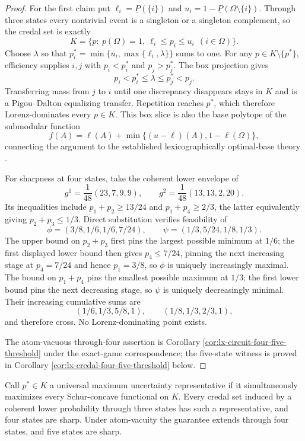 \begin{proof}
For the first claim put
$\ell_i=\underline P(\{i\})$ and
$u_i=1-\underline P(\Omega\setminus\{i\})$.  Through three states every
nontrivial event is a singleton or a singleton complement, so the credal set
is exactly
\[
 K=\{p:\ p(\Omega)=1,\ \ell_i\leq p_i\leq u_i\ \ (i\in\Omega)\}.
 \tag{BS}\label{eq:lx-credal-box-slice}
\]
Choose $\lambda$ so that
$p_i^*=\min\{u_i,\max\{\ell_i,\lambda\}\}$ sums to one.  For any
$p\in K\setminus\{p^*\}$, efficiency supplies $i,j$ with
$p_i<p_i^*$ and $p_j>p_j^*$.  The box projection gives
\[
 p_i<p_i^*\leq\lambda\leq p_j^*<p_j.
\]
Transferring mass from $j$ to $i$ until one discrepancy disappears stays in
$K$ and is a Pigou--Dalton equalizing transfer.  Repetition reaches $p^*$,
which therefore Lorenz-dominates every $p\in K$.  This box slice is also the
base polytope of the submodular function
\[
 f(A)=\ell(A)+\min\{(u-\ell)(A),1-\ell(\Omega)\},
\]
connecting the argument to the established lexicographically optimal-base
theory \citep{Fujishige1980,FrankMurota2022}.

For sharpness at four states, take the coherent lower envelope of
\[
 g^1=\frac1{48}(23,7,9,9),\qquad
 g^2=\frac1{48}(13,13,2,20).
 \tag{CLP4}\label{eq:lx-credal-four-generators}
\]
Its inequalities include
$p_1+p_2\geq13/24$ and $p_1+p_4\geq2/3$, the latter equivalently giving
$p_2+p_3\leq1/3$.  Direct substitution verifies feasibility of
\[
 \phi=(3/8,1/6,1/6,7/24),\qquad
 \psi=(1/3,5/24,1/8,1/3).
\]
The upper bound on $p_2+p_3$ first pins the largest possible minimum at
$1/6$; the first displayed lower bound then gives $p_4\leq7/24$, pinning the
next increasing stage at $p_4=7/24$ and hence $p_1=3/8$, so
$\phi$ is uniquely increasingly maximal.  The bound on $p_1+p_4$ pins the
smallest possible maximum at $1/3$; the first lower bound pins the next
decreasing stage, so $\psi$ is uniquely decreasingly minimal.  Their
increasing cumulative sums are
\[
 (1/6,1/3,5/8,1),\qquad (1/8,1/3,2/3,1),
\]
and therefore cross.  No Lorenz-dominating point exists.

The atom-vacuous through-four assertion is Corollary
\ref{cor:lx-circuit-four-five-threshold} under the exact-game correspondence;
the five-state witness is proved in Corollary
\ref{cor:lx-credal-four-five-threshold} below.
\end{proof}

\begin{corollary}
\label{cor:lx-credal-universal-uncertainty}
Call $p^*\in K$ a universal maximum uncertainty representative if it
simultaneously maximizes every Schur-concave functional on $K$.  Every credal
set induced by a coherent lower probability through three states has such a
representative, and four states are sharp.  Under atom-vacuity the guarantee
extends through four states, and five states are sharp.
\end{corollary}

